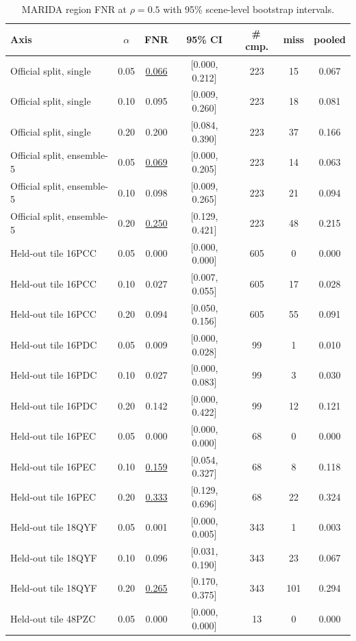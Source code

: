 \begin{table}[t]
\centering
\caption{MARIDA region FNR at $\rho=0.5$ with 95\% scene-level bootstrap intervals.}
\label{tab:uncertainty_marida}
\footnotesize
\setlength{\tabcolsep}{2pt}
\begin{tabular}{lcccccc}
\toprule
Axis & $\alpha$ & FNR & 95\% CI & \#\,cmp. & miss & pooled \\
\midrule
Official split, single & 0.05 & \underline{0.066} & [0.000, 0.212] & 223 & 15 & 0.067 \\
Official split, single & 0.10 & 0.095 & [0.009, 0.260] & 223 & 18 & 0.081 \\
Official split, single & 0.20 & 0.200 & [0.084, 0.390] & 223 & 37 & 0.166 \\
Official split, ensemble-5 & 0.05 & \underline{0.069} & [0.000, 0.205] & 223 & 14 & 0.063 \\
Official split, ensemble-5 & 0.10 & 0.098 & [0.009, 0.265] & 223 & 21 & 0.094 \\
Official split, ensemble-5 & 0.20 & \underline{0.250} & [0.129, 0.421] & 223 & 48 & 0.215 \\
Held-out tile 16PCC & 0.05 & 0.000 & [0.000, 0.000] & 605 & 0 & 0.000 \\
Held-out tile 16PCC & 0.10 & 0.027 & [0.007, 0.055] & 605 & 17 & 0.028 \\
Held-out tile 16PCC & 0.20 & 0.094 & [0.050, 0.156] & 605 & 55 & 0.091 \\
Held-out tile 16PDC & 0.05 & 0.009 & [0.000, 0.028] & 99 & 1 & 0.010 \\
Held-out tile 16PDC & 0.10 & 0.027 & [0.000, 0.083] & 99 & 3 & 0.030 \\
Held-out tile 16PDC & 0.20 & 0.142 & [0.000, 0.422] & 99 & 12 & 0.121 \\
Held-out tile 16PEC & 0.05 & 0.000 & [0.000, 0.000] & 68 & 0 & 0.000 \\
Held-out tile 16PEC & 0.10 & \underline{0.159} & [0.054, 0.327] & 68 & 8 & 0.118 \\
Held-out tile 16PEC & 0.20 & \underline{0.333} & [0.129, 0.696] & 68 & 22 & 0.324 \\
Held-out tile 18QYF & 0.05 & 0.001 & [0.000, 0.005] & 343 & 1 & 0.003 \\
Held-out tile 18QYF & 0.10 & 0.096 & [0.031, 0.190] & 343 & 23 & 0.067 \\
Held-out tile 18QYF & 0.20 & \underline{0.265} & [0.170, 0.375] & 343 & 101 & 0.294 \\
Held-out tile 48PZC & 0.05 & 0.000 & [0.000, 0.000] & 13 & 0 & 0.000 \\

\end{tabular}
\end{table}
